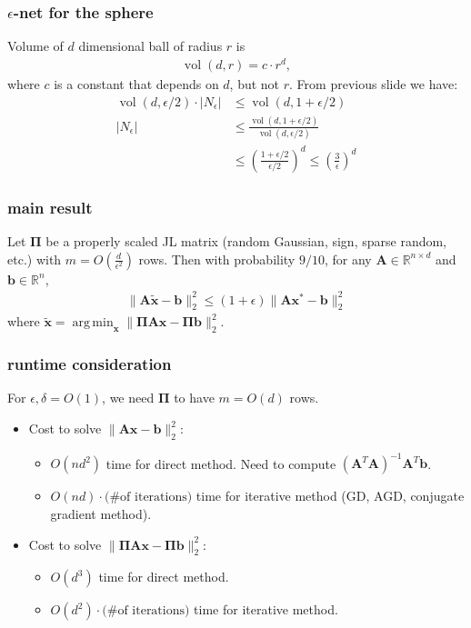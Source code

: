 \documentclass[compress]{beamer}
\newcommand{\bs}[1]{\boldsymbol{#1}}
\newcommand{\bv}[1]{\mathbf{#1}}
\newcommand{\R}{\mathbb{R}}
\DeclareMathOperator*{\argmin}{arg\,min}
\DeclareMathOperator{\vol}{vol}
\begin{document}
	\begin{frame}[t]
		\frametitle{$\epsilon$-net for the sphere}
		Volume of $d$ dimensional ball of radius $r$ is 
		\begin{align*}
			\vol(d,r) = c\cdot r^d,
		\end{align*}
		where $c$ is a constant that depends on $d$, but not $r$.
		\vspace{1em}
		From previous slide we have:
		\begin{align*}
			\vol(d,\epsilon/2) \cdot |N_\epsilon| &\leq \vol(d,1+\epsilon/2) \\  
			|N_\epsilon| &\leq \frac{\vol(d,1+\epsilon/2)}{\vol(d,\epsilon/2)} \\
			&\leq \left(\frac{1+\epsilon/2}{\epsilon/2}\right)^d\leq \left(\frac{3}{\epsilon}\right)^d
		\end{align*}
	\end{frame}
	
	\begin{frame} 
		\frametitle{main result}
		\begin{theorem}
			Let $\bs{\Pi}$ be a properly scaled JL matrix (random Gaussian, sign, sparse random, etc.) with $m = O\left(\frac{d}{\epsilon^2}\right)$ rows. Then with probability $9/10$, for any $\bv{A}\in \R^{n\times d}$ and $\bv{b}\in \R^n$,
			\begin{align*}
				\|\bv{A}\tilde{\bv{x}} - \bv{b}\|_2^2 \leq (1+\epsilon) \|\bv{A}\bv{x}^* - \bv{b}\|_2^2
			\end{align*}
			where $\tilde{\bv{x}} = \argmin_{\bv{x}} \|\bs{\Pi}\bv{A}\bv{x} - \bs{\Pi}\bv{b}\|_2^2$.
		\end{theorem}
		\end{frame}

\begin{frame}[t]
	\frametitle{runtime consideration}
	For $\epsilon, \delta = O(1)$, we need $\bs{\Pi}$ to have $m = O(d)$ rows.
	\begin{itemize}
		\item Cost to solve $\|\bv{A}\bv{x} - \bv{b}\|_2^2$: 
		\begin{itemize}
			\item \alert{$O(nd^2)$} time for direct method. Need to compute $(\bv{A}^T\bv{A})^{-1}\bv{A}^T\bv{b}$.
			\item \alert{$O(nd)\cdot \text{(\# of iterations)}$} time for iterative method (GD, AGD, conjugate gradient method).
		\end{itemize}
			\item Cost to solve $\|\bs{\Pi}\bv{A}\bv{x} - \bs{\Pi}\bv{b}\|_2^2$: 
		\begin{itemize}
			\item \alert{$O(d^3)$} time for direct method. 
			\item \alert{$O(d^2)\cdot \text{(\# of iterations)}$} time for iterative method.
		\end{itemize}
\end{itemize}
\end{frame}
\end{document}
